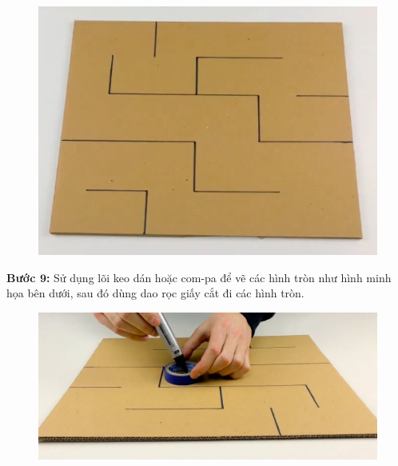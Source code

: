 \begin{multicols}{2}
\begin{figure}[H]
		\vspace*{1pt}
		\includegraphics[width= 0.8\linewidth]{13}
		\vspace*{-10pt}
	\end{figure}
	\textbf{\color{toancuabi}Bước $\pmb{9}$:} Sử dụng lõi keo dán hoặc com-pa để vẽ các hình tròn như hình minh họa bên dưới, sau đó dùng dao rọc giấy cắt đi các hình tròn.
	\begin{figure}[H]
		\vspace*{-5pt}
		\centering
		\captionsetup{labelformat= empty, justification=centering}
		\includegraphics[width= 0.8\linewidth]{14}
		

\end{figure}
\end{multicols}
